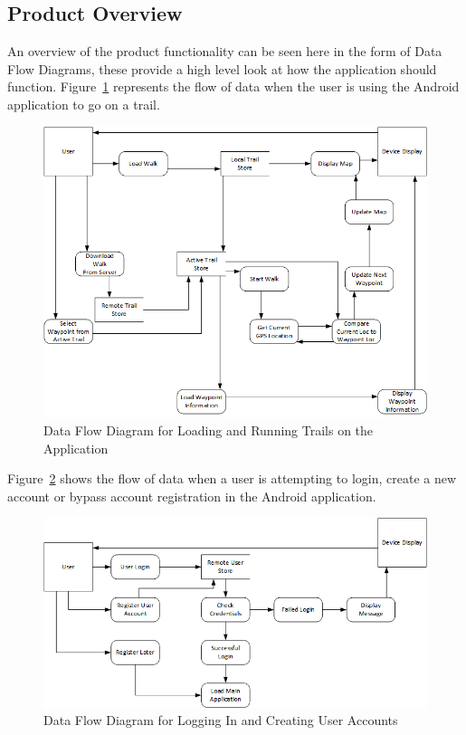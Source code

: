 \documentclass[11pt,a4paper]{article}
\begin{document}
\subsection{Product Overview}
\label{sec:product-overview}
An overview of the product functionality can be seen here in the form of Data Flow Diagrams, these provide a high level look at how the application should function. Figure~\ref{fig:walkDFD} represents the flow of data when the user is using the Android application to go on a trail.

\begin{figure}[H]
\begin{center}
\includegraphics[scale=0.65]{walkDFD.png}
\caption{Data Flow Diagram for Loading and Running Trails on the Application}
\label{fig:walkDFD}
\end{center}
\end{figure}

Figure~\ref{fig:userLoginDFD} shows the flow of data when a user is attempting to login, create a new account or bypass account registration in the Android application.

\begin{figure}[H]
\begin{center}
\includegraphics[scale=0.65]{userLoginDFD.png}
\caption{Data Flow Diagram for Logging In and Creating User Accounts}
\label{fig:userLoginDFD}
\end{center}
\end{figure}
\end{document}
